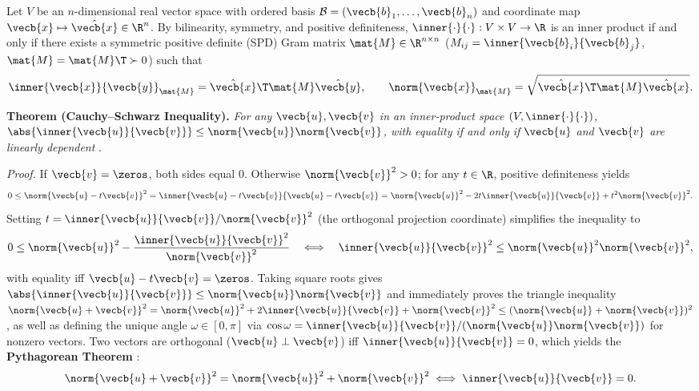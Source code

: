 \documentclass[../../../../master.tex]{subfiles}
\begin{document}
\begin{coremath}
Let $V$ be an $n$-dimensional real vector space with ordered basis $\mathcal{B} = (\vecb{b}_1, \dots, \vecb{b}_n)$ and coordinate map $\vecb{x} \mapsto \hat{\vecb{x}} \in \R^n$. By bilinearity, symmetry, and positive definiteness, $\inner{\cdot}{\cdot} : V \times V \to \R$ is an inner product if and only if there exists a symmetric positive definite (SPD) Gram matrix $\mat{M} \in \R^{n \times n}$ ($M_{ij} = \inner{\vecb{b}_i}{\vecb{b}_j}$, $\mat{M} = \mat{M}\T \succ 0$) such that 
\begin{equation}
  \inner{\vecb{x}}{\vecb{y}}_{\mat{M}} = \hat{\vecb{x}}\T\mat{M}\hat{\vecb{y}}, \qquad \norm{\vecb{x}}_{\mat{M}} = \sqrt{\hat{\vecb{x}}\T\mat{M}\hat{\vecb{x}}}.
  \label{eq:vecnorm:spd_inner}
\end{equation}

\textbf{Theorem (Cauchy--Schwarz Inequality).} \emph{For any $\vecb{u}, \vecb{v}$ in an inner-product space $(V, \inner{\cdot}{\cdot})$, $\abs{\inner{\vecb{u}}{\vecb{v}}} \le \norm{\vecb{u}}\norm{\vecb{v}}$, with equality if and only if $\vecb{u}$ and $\vecb{v}$ are linearly dependent} .

\emph{Proof.} If $\vecb{v} = \zeros$, both sides equal $0$. Otherwise $\norm{\vecb{v}}^2 > 0$; for any $t \in \R$, positive definiteness yields
\[
  0 \le \norm{\vecb{u} - t\vecb{v}}^2 = \inner{\vecb{u} - t\vecb{v}}{\vecb{u} - t\vecb{v}} = \norm{\vecb{u}}^2 - 2t\inner{\vecb{u}}{\vecb{v}} + t^2\norm{\vecb{v}}^2.
\]
Setting $t = \inner{\vecb{u}}{\vecb{v}} / \norm{\vecb{v}}^2$ (the orthogonal projection coordinate) simplifies the inequality to
\[
  0 \le \norm{\vecb{u}}^2 - \frac{\inner{\vecb{u}}{\vecb{v}}^2}{\norm{\vecb{v}}^2} \quad\Longleftrightarrow\quad \inner{\vecb{u}}{\vecb{v}}^2 \le \norm{\vecb{u}}^2\norm{\vecb{v}}^2,
\]
with equality iff $\vecb{u} - t\vecb{v} = \zeros$. Taking square roots gives $\abs{\inner{\vecb{u}}{\vecb{v}}} \le \norm{\vecb{u}}\norm{\vecb{v}}$ and immediately proves the triangle inequality $\norm{\vecb{u}+\vecb{v}}^2 = \norm{\vecb{u}}^2 + 2\inner{\vecb{u}}{\vecb{v}} + \norm{\vecb{v}}^2 \le (\norm{\vecb{u}} + \norm{\vecb{v}})^2$, as well as defining the unique angle $\omega \in [0, \pi]$ via $\cos\omega = \inner{\vecb{u}}{\vecb{v}} / (\norm{\vecb{u}}\norm{\vecb{v}})$ for nonzero vectors. Two vectors are orthogonal ($\vecb{u} \perp \vecb{v}$) iff $\inner{\vecb{u}}{\vecb{v}} = 0$, which yields the \textbf{Pythagorean Theorem} :
\begin{equation}
  \norm{\vecb{u} + \vecb{v}}^2 = \norm{\vecb{u}}^2 + \norm{\vecb{v}}^2 \iff \inner{\vecb{u}}{\vecb{v}} = 0.
  \label{eq:vecnorm:pythagoras}
\end{equation}
\end{coremath}
\end{document}
